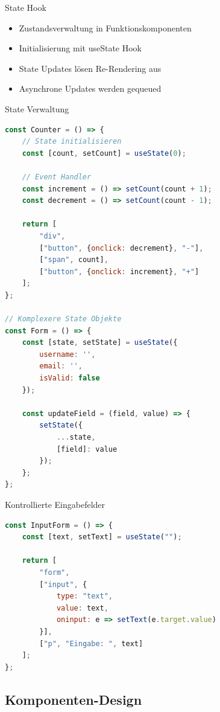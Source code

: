 \begin{concept}{State Hook}
    \begin{itemize}
        \item Zustandsverwaltung in Funktionskomponenten
        \item Initialisierung mit useState Hook
        \item State Updates lösen Re-Rendering aus
        \item Asynchrone Updates werden gequeued
    \end{itemize}
\end{concept}

\begin{KR}{State Verwaltung}
\begin{lstlisting}[language=JavaScript, style=basesmol]
const Counter = () => {
    // State initialisieren
    const [count, setCount] = useState(0);
    
    // Event Handler
    const increment = () => setCount(count + 1);
    const decrement = () => setCount(count - 1);
    
    return [
        "div",
        ["button", {onclick: decrement}, "-"],
        ["span", count],
        ["button", {onclick: increment}, "+"]
    ];
};

// Komplexere State Objekte
const Form = () => {
    const [state, setState] = useState({
        username: '',
        email: '',
        isValid: false
    });
    
    const updateField = (field, value) => {
        setState({
            ...state,
            [field]: value
        });
    };
};
\end{lstlisting}
\end{KR}

\begin{KR}{Kontrollierte Eingabefelder}
\begin{lstlisting}[language=JavaScript, style=basesmol]
const InputForm = () => {
    const [text, setText] = useState("");
    
    return [
        "form",
        ["input", {
            type: "text",
            value: text,
            oninput: e => setText(e.target.value)
        }],
        ["p", "Eingabe: ", text]
    ];
};
\end{lstlisting}
\end{KR}

\subsection{Komponenten-Design}

